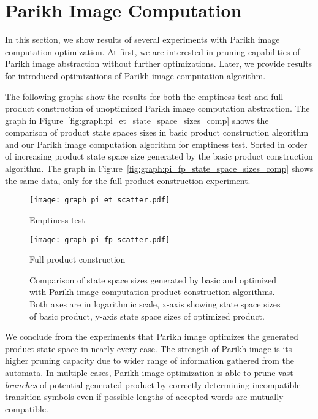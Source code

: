 \section{Parikh Image Computation}

In this section, we show results of several experiments with Parikh image computation optimization. At first, we are interested in pruning capabilities of Parikh image abstraction without further optimizations. Later, we provide results for introduced optimizations of Parikh image computation algorithm.

The following graphs show the results for both the emptiness test and full product construction of unoptimized Parikh image computation abstraction. The graph in Figure~\ref{fig:graph:pi_et_state_space_sizes_comp} shows the comparison of product state spaces sizes in basic product construction algorithm and our Parikh image computation algorithm for emptiness test. Sorted in order of increasing product state space size generated by the basic product construction algorithm. The graph in Figure~\ref{fig:graph:pi_fp_state_space_sizes_comp} shows the same data, only for the full product construction experiment.

\begin{figure*}[ht]
    \centering
    \begin{minipage}{0.49\linewidth}
        \centering
        \texttt{[image: graph\_pi\_et\_scatter.pdf]}
        \caption{Emptiness test}
        \label{fig:graph:pi_et_state_space_sizes_comp}
    \end{minipage}
    \hfill
    \begin{minipage}{0.49\linewidth}
        \centering
        \texttt{[image: graph\_pi\_fp\_scatter.pdf]}
        \caption{Full product construction}
        \label{fig:graph:pi_fp_state_space_sizes_comp}
    \end{minipage}
    \vspace{0.5cm}
    \caption{Comparison of state space sizes generated by basic and optimized with Parikh image computation product construction algorithms. Both axes are in logarithmic scale, x-axis showing state space sizes of basic product, y-axis state space sizes of optimized product.}
    \label{fig:graph:pi_product_state_space_sizes}
\end{figure*}

We conclude from the experiments that Parikh image optimizes the generated product state space in nearly every case. The strength of Parikh image is its higher pruning capacity due to wider range of information gathered from the automata. In multiple cases, Parikh image optimization is able to prune vast \emph{branches} of potential generated product by correctly determining incompatible transition symbols even if possible lengths of accepted words are mutually compatible.

